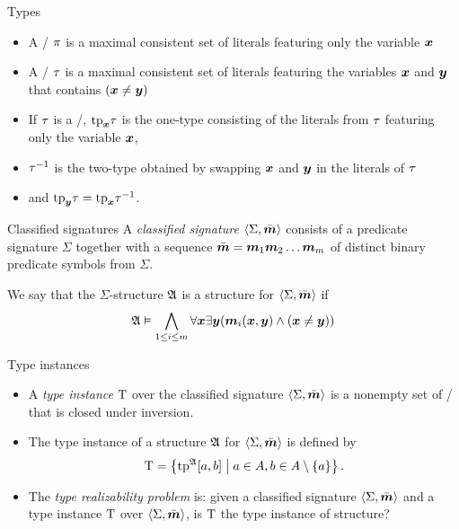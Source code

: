 \documentclass{beamer}
\begin{document}
\begin{frame}{Types}
\begin{itemize}
  \item A \onetype/ $\pi$ is a maximal consistent set of literals featuring
  only the variable $\bm{x}$
  \item A \twotype/ $\tau$ is a maximal consistent set of literals featuring the
  variables $\bm{x}$ and $\bm{y}$ that contains $(\bm{x}\neq\bm{y})$
\begin{center}
\end{center}
  \item If $\tau$ is a \twotype/, $\mathrm{tp}_{\bm{x}}\tau$ is the one-type consisting of the
  literals from $\tau$ featuring only the variable $\bm{x}$,
  \item $\tau^{-1}$ is the two-type obtained by swapping $\bm{x}$ and $\bm{y}$ in the
  literals of $\tau$
  \item and $\mathrm{tp}_{\bm{y}}\tau=\mathrm{tp}_{\bm{x}}\tau^{-1}$.
\end{itemize}
\end{frame}

\begin{frame}{Classified signatures}
A \emph{classified signature} $\left\langle \Sigma,\bar{\bm{m}} \right\rangle$ consists of a predicate
signature $\Sigma$ together with a sequence $\sms=\smm1\smm2\dots\smm\nm$ of
distinct binary predicate symbols from $\Sigma$.

We say that the $\Sigma$-structure $\mathfrak{A}$ is a structure for $\left\langle \Sigma,\bar{\bm{m}} \right\rangle$
if
\[
\mathfrak{A}\vDash\bigwedge_{1\leq i\leq m}\forall\bm{x}\exists\bm{y}
(\bm{m}_{i}(\bm{x},\bm{y})\land(\bm{x}\neq\bm{y}))
\]
\end{frame}

\begin{frame}{Type instances}
\begin{itemize}
  \item 
  A \emph{type instance} $\mathrm{T}$ over the classified signature $\left\langle \Sigma,\bar{\bm{m}} \right\rangle$
  is a nonempty set of \twotypes/ that is closed under inversion.

  \item 
  The type instance of a structure $\mathfrak{A}$ for $\left\langle \Sigma,\bar{\bm{m}} \right\rangle$ is defined by
  \[
  \mathrm{T} = \left\{\operatorname{tp}^{\mathfrak{A}}[a,b]\mathrel{}\middle|\mathrel{}a\in A,b\in A\setminus\left\{a\right\}\right\}.
  \]

  \item The \emph{type realizability problem} is: given a classified signature
  $\left\langle \Sigma,\bar{\bm{m}} \right\rangle$ and a type instance $\mathrm{T}$ over $\left\langle \Sigma,\bar{\bm{m}} \right\rangle$,
  is $\mathrm{T}$ the type instance of structure?
\end{itemize}
\end{frame}
\end{document}

